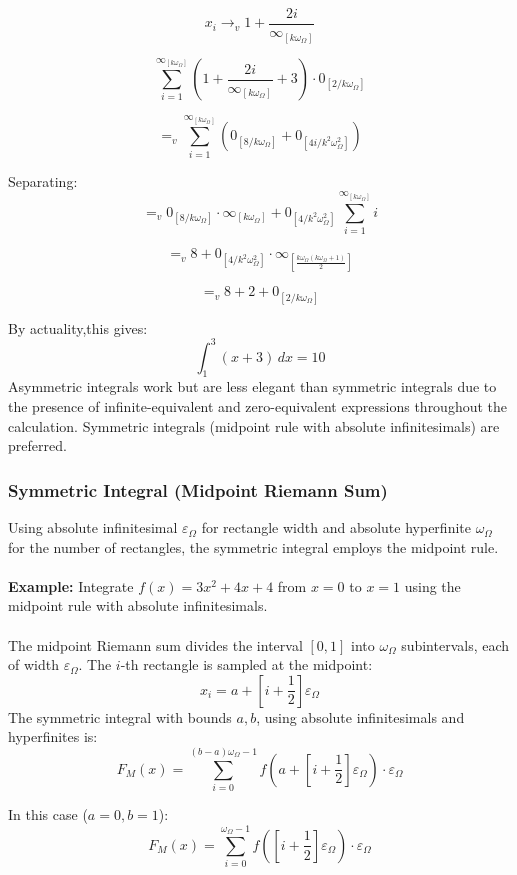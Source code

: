 \documentclass{article}
\begin{document}
$$x_i \to_v 1 + \frac{2i}{\infty_{[k\omega_\Omega]}}$$

$$\sum_{i=1}^{\infty_{[k\omega_\Omega]}} \left(1 + \frac{2i}{\infty_{[k\omega_\Omega]}} + 3\right) \cdot 0_{[2/k\omega_\Omega]}$$

$$=_v \sum_{i=1}^{\infty_{[k\omega_\Omega]}} \left(0_{[8/k\omega_\Omega]} + 0_{[4i/k^2\omega_\Omega^2]}\right)$$

Separating:
$$=_v 0_{[8/k\omega_\Omega]} \cdot \infty_{[k\omega_\Omega]} + 0_{[4/k^2\omega_\Omega^2]} \sum_{i=1}^{\infty_{[k\omega_\Omega]}} i$$

$$=_v 8 + 0_{[4/k^2\omega_\Omega^2]} \cdot \infty_{[\frac{k\omega_\Omega(k\omega_\Omega + 1)}{2}]}$$

$$=_v 8 + 2 + 0_{[2/k\omega_\Omega]}$$

By actuality,this gives:
$$\int_1^3 (x + 3) \, dx = 10$$Asymmetric integrals work but are less elegant than symmetric integrals due to the presence of infinite-equivalent and zero-equivalent expressions throughout the calculation. Symmetric integrals (midpoint rule with absolute infinitesimals) are preferred.

\subsubsection{Symmetric Integral (Midpoint Riemann Sum)}

Using absolute infinitesimal $\varepsilon_\Omega$ for rectangle width and absolute hyperfinite $\omega_\Omega$ for the number of rectangles, the symmetric integral employs the midpoint rule.\\\\\textbf{Example:} Integrate $f(x) = 3x^2 + 4x + 4$ from $x = 0$ to $x = 1$ using the midpoint rule with absolute infinitesimals.\\\\The midpoint Riemann sum divides the interval $[0, 1]$ into $\omega_\Omega$ subintervals, each of width $\varepsilon_\Omega$. The $i$-th rectangle is sampled at the midpoint:
$$x_i = a + \left[i + \frac{1}{2}\right]\varepsilon_\Omega$$The symmetric integral with bounds $a, b$, using absolute infinitesimals and hyperfinites is:
$$F_M(x) = \sum_{i=0}^{(b-a)\omega_\Omega - 1} f\left(a+\left[i + \frac{1}{2}\right]\varepsilon_\Omega\right) \cdot \varepsilon_\Omega$$

In this case ($a = 0, b = 1$):
$$F_M(x) = \sum_{i=0}^{\omega_\Omega - 1} f\left(\left[i + \frac{1}{2}\right]\varepsilon_\Omega\right) \cdot \varepsilon_\Omega$$
\end{document}
